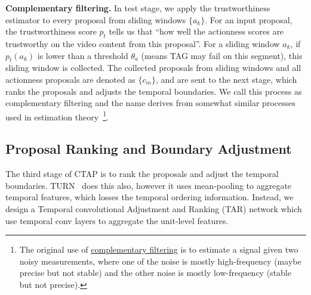 \documentclass[runningheads]{llncs}
\begin{document}
\textbf{Complementary filtering.} In test stage, we apply the trustworthiness estimator to every proposal from sliding windows $\{a_k\}$. For an input proposal, the trustworthiness score $p_t$ tells us that ``how well the actionness scores are trustworthy on the video content from this proposal''. For a sliding window $a_k$, if $p_t(a_k)$ is lower than a threshold $\theta_a$ (means TAG may fail on this segment), this sliding window is collected. The collected proposals from sliding windows and all actionness proposals are denoted as $\{c_m\}$, and are sent to the next stage, which ranks the proposals and adjusts the temporal boundaries. We call this process as complementary filtering and the name derives from somewhat similar processes used in estimation theory~\footnote{The original use of \href{https://ocw.mit.edu/courses/aeronautics-and-astronautics/16-333-aircraft-stability-and-control-fall-2004/lecture-notes/lecture_15.pdf}{complementary filtering} is to estimate a signal given two noisy measurements, where one of the noise is mostly high-frequency (maybe precise but not stable) and the other noise is mostly low-frequency (stable but not precise).}.


\subsection{Proposal Ranking and Boundary Adjustment}
The third stage of CTAP is to rank the proposals and adjust the temporal boundaries. TURN~\cite{Gao_2017_ICCV} does this also, however it uses mean-pooling to aggregate temporal features, which losses the temporal ordering information. Instead, we design a Temporal convolutional Adjustment and Ranking (TAR) network which use temporal conv layers to aggregate the unit-level features. 
\end{document}
